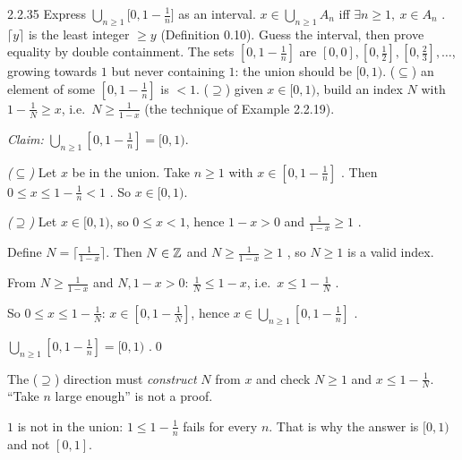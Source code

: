 \begin{bookex}[essential]{2.2.35}
Express $\displaystyle\bigcup_{n\ge1}\Big[0,1-\frac1n\Big]$ as an interval.
\solution
\given $x\in\bigcup_{n\ge1}A_n$ iff $\exists n\ge1,\ x\in A_n$ . $\lceil y\rceil$ is the least integer $\ge y$ (Definition 0.10).
\goal Guess the interval, then prove equality by double containment. The sets $[0,1-\frac1n]$ are $[0,0],[0,\frac12],[0,\frac23],\dots$, growing towards $1$ but never containing $1$: the union should be $[0,1)$.
\plan ($\subseteq$) an element of some $[0,1-\frac1n]$ is $<1$. ($\supseteq$) given $x\in[0,1)$, build an index $N$ with $1-\frac1N\ge x$, i.e.\ $N\ge\frac1{1-x}$ (the technique of Example 2.2.19).
\begin{steps}
\item \emph{Claim:} $\bigcup_{n\ge1}[0,1-\frac1n]=[0,1)$.
\item \emph{($\subseteq$)} Let $x$ be in the union. Take $n\ge1$ with $x\in[0,1-\frac1n]$ . Then $0\le x\le1-\frac1n<1$ . So $x\in[0,1)$.
\item \emph{($\supseteq$)} Let $x\in[0,1)$, so $0\le x<1$, hence $1-x>0$ and $\frac1{1-x}\ge1$ .
\item Define $N=\big\lceil\frac1{1-x}\big\rceil$. Then $N\in\mathbb{Z}$ and $N\ge\frac1{1-x}\ge1$ , so $N\ge1$ is a valid index.
\item From $N\ge\frac1{1-x}$ and $N,1-x>0$: $\frac1N\le1-x$, i.e.\ $x\le1-\frac1N$ .
\item So $0\le x\le1-\frac1N$: $x\in[0,1-\frac1N]$, hence $x\in\bigcup_{n\ge1}[0,1-\frac1n]$ .
\end{steps}
\conclusion $\bigcup_{n\ge1}[0,1-\frac1n]=[0,1)$ .\qed
\begin{compare}
\item The ($\supseteq$) direction must \emph{construct} $N$ from $x$ and check $N\ge1$ and $x\le1-\frac1N$. ``Take $n$ large enough'' is not a proof.
\item $1$ is not in the union: $1\le1-\frac1n$ fails for every $n$. That is why the answer is $[0,1)$ and not $[0,1]$.
\end{compare}
\end{bookex}

